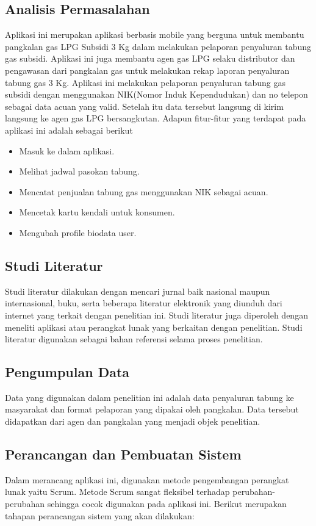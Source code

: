 \subsection{Analisis Permasalahan}
Aplikasi ini merupakan aplikasi berbasis mobile yang berguna untuk membantu pangkalan gas LPG Subsidi 3 Kg dalam melakukan pelaporan penyaluran tabung gas subsidi. Aplikasi ini juga membantu agen gas LPG selaku distributor dan pengawasan dari pangkalan gas untuk melakukan rekap laporan penyaluran tabung gas 3 Kg. Aplikasi ini melakukan pelaporan penyaluran tabung gas subsidi dengan menggunakan NIK(Nomor Induk Kependudukan) dan no telepon sebagai data acuan yang valid. Setelah itu data tersebut langsung di kirim langsung ke agen gas LPG bersangkutan. Adapun fitur-fitur yang terdapat pada aplikasi ini adalah sebagai berikut
\begin{itemize}
		\itemsep0em
		\item Masuk ke dalam aplikasi.
		\item Melihat jadwal pasokan tabung.
		\item Mencatat penjualan tabung gas menggunakan NIK sebagai acuan.
		\item Mencetak kartu kendali untuk konsumen.
		\item Mengubah profile biodata user.
\end{itemize}

\subsection{Studi Literatur}
Studi literatur dilakukan dengan mencari jurnal baik nasional maupun internasional, buku, serta beberapa literatur elektronik yang diunduh dari internet yang terkait dengan penelitian ini. Studi literatur juga diperoleh dengan meneliti aplikasi atau perangkat lunak yang berkaitan dengan penelitian. Studi literatur digunakan sebagai bahan referensi selama proses penelitian.

\subsection{Pengumpulan Data}
Data yang digunakan dalam penelitian ini adalah data penyaluran tabung ke masyarakat dan format pelaporan yang dipakai oleh pangkalan. Data tersebut didapatkan dari agen dan pangkalan yang menjadi objek penelitian.

\subsection{Perancangan dan Pembuatan Sistem}
Dalam merancang aplikasi ini, digunakan metode pengembangan perangkat lunak yaitu Scrum. Metode Scrum sangat fleksibel terhadap perubahan-perubahan sehingga cocok digunakan pada aplikasi ini. Berikut merupakan tahapan perancangan sistem yang akan dilakukan:

